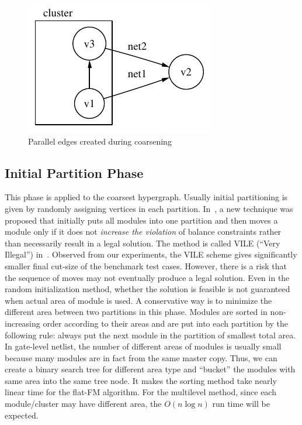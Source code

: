 \documentclass[journal]{IEEEtran}
\begin{document}
\begin{figure}
\centering
\includegraphics{parallel}
\caption{Parallel edges created during coarsening}
\label{parallel_edges}
\end{figure}


\subsection{Initial Partition Phase}
\label{initial}
This phase is applied to the coarsest hypergraph. Usually initial
partitioning is given by randomly assigning vertices in each partition.
In~\cite{hypergraph_improved_2000}, a new technique was proposed that
initially puts all modules into one partition and then moves a module
only if it does 
not {\it increase the violation} of balance constraints rather than
necessarily result in a legal solution. The method is called VILE
(``Very Illegal'') in~\cite{hypergraph_improved_2000}. 
Observed from our experiments,
the VILE scheme gives significantly smaller final cut-size of the 
benchmark test cases. However, there is a risk that the sequence of
moves may not eventually produce a legal solution. 
Even in the random initialization method, whether the solution is
feasible is not guaranteed when actual area of module is used.
A conservative way is to minimize the different area between two
partitions in this phase. Modules are sorted in
non-increasing order according to their areas
and are put into each partition by the following
rule: always put the next module in the partition of smallest total
area. In gate-level netlist, the number of different areas of modules
is usually small because many modules are in fact from the same master
copy. Thus, we can create a binary search tree for different area type
and ``bucket'' the modules with same area into the same tree node. 
It makes the sorting method take nearly linear time for the flat-FM
algorithm. For the multilevel method, since each 
module/cluster may have different area, the $O(n \log n)$ run time will be
expected.
\end{document}
